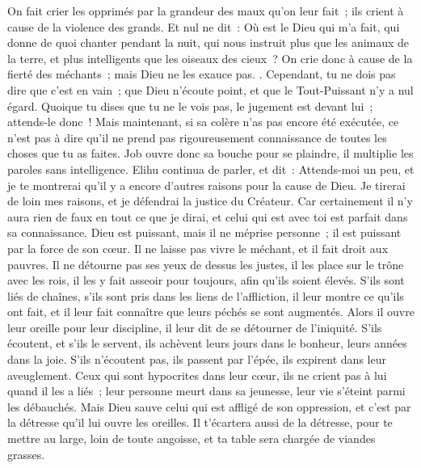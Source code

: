 \begin{multicols}{2}
On fait crier les opprimés par la grandeur des maux qu'on leur fait~; ils crient à cause de la violence des grands.
Et nul ne dit~: Où est le Dieu qui m'a fait, qui donne de quoi chanter pendant la nuit,
qui nous instruit plus que les animaux de la terre, et plus intelligents que les oiseaux des cieux~?
On crie donc à cause de la fierté des méchants~; mais Dieu ne les exauce pas.
.
Cependant, tu ne dois pas dire que c'est en vain~; que Dieu n'écoute point, et que le Tout-Puissant n'y a nul égard.
Quoique tu dises que tu ne le vois pas, le jugement est devant lui~; attends-le donc~!
Mais maintenant, si sa colère n'as pas encore été exécutée, ce n'est pas à dire qu'il ne prend pas rigoureusement connaissance de toutes les choses que tu as faites.
Job ouvre donc sa bouche pour se plaindre, il multiplie les paroles sans intelligence.
\VerseOne{}Elihu continua de parler, et dit~:
Attends-moi un peu, et je te montrerai qu'il y a encore d'autres raisons pour la cause de Dieu.
Je tirerai de loin mes raisons, et je défendrai la justice du Créateur.
Car certainement il n'y aura rien de faux en tout ce que je dirai, et celui qui est avec toi est parfait dans sa connaissance.
Dieu est puissant, mais il ne méprise personne~; il est puissant par la force de son cœur.
Il ne laisse pas vivre le méchant, et il fait droit aux pauvres.
Il ne détourne pas ses yeux de dessus les justes, il les place sur le trône avec les rois, il les y fait asseoir pour toujours, afin qu'ils soient élevés.
S'ils sont liés de chaînes, s'ils sont pris dans les liens de l'affliction,
il leur montre ce qu'ils ont fait, et il leur fait connaître que leurs péchés se sont augmentés.
Alors il ouvre leur oreille pour leur discipline, il leur dit de se détourner de l'iniquité.
S'ils écoutent, et s'ils le servent, ils achèvent leurs jours dans le bonheur, leurs années dans la joie.
S'ils n'écoutent pas, ils passent par l'épée, ils expirent dans leur aveuglement.
Ceux qui sont hypocrites dans leur cœur, ils ne crient pas à lui quand il les a liés~;
leur personne meurt dans sa jeunesse, leur vie s'éteint parmi les débauchés.
Mais Dieu sauve celui qui est affligé de son oppression, et c'est par la détresse qu'il lui ouvre les oreilles.
Il t'écartera aussi de la détresse, pour te mettre au large, loin de toute angoisse, et ta table sera chargée de viandes grasses.

\end{multicols}
